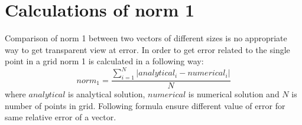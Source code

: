 \section{Calculations of norm 1} \label{s:appendix:norms:calcNorm1}
	Comparison of norm 1 between two vectors of different sizes is no appropriate way to get transparent view at error. In order to get error related to the single point in a grid norm 1 is calculated in a following way:
	\begin{equation} \label{eq:calcNorm1}
		norm_1=\frac{\sum_{i=1}^{N}|analytical_i - numerical_i|}{N}
	\end{equation}
	where $analytical$ is analytical solution, $numerical$ is numerical solution and $N$ is number of points in grid. Following formula ensure different value of error for same relative error of a vector.